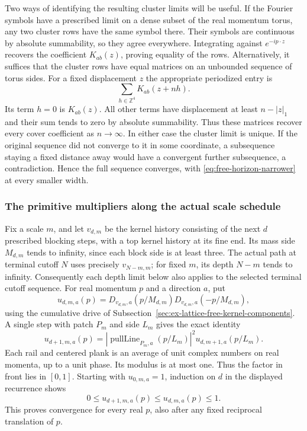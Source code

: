 Two ways of identifying the resulting cluster limits will be useful.
If the Fourier symbols have a prescribed limit on a dense subset of
the real momentum torus, any two cluster rows have the same symbol
there. Their symbols are continuous by absolute summability, so they
agree everywhere. Integrating against $e^{-ip\cdot z}$ recovers the
coefficient $K_{ab}(z)$, proving equality of the rows. Alternatively,
it suffices that the cluster rows have equal matrices on an unbounded
sequence of torus sides. For a fixed displacement $z$ the appropriate
periodized entry is
\[
                       \sum_{h\in\mathbb Z^4}K_{ab}(z+nh).
\]
Its term $h=0$ is $K_{ab}(z)$. All other terms have displacement
at least $n-|z|_1$ and their sum tends to zero by absolute summability.
Thus these matrices recover every cover coefficient as $n\to\infty$.
In either case the cluster limit is unique. If the original sequence
did not converge to it in some coordinate, a subsequence staying a
fixed distance away would have a convergent further subsequence,
a contradiction. Hence the full sequence converges, with
\eqref{eq:free-horizon-narrower} at every smaller width.

\subsubsection{The primitive multipliers along the actual scale schedule}
Fix a scale $m$, and let $v_{d,m}$ be the kernel history consisting of the next
$d$ prescribed blocking steps, with a top kernel history at its fine end. Its
mass side $M_{d,m}$ tends to infinity, since each block side is at least
three. The actual path at terminal cutoff $N$ uses precisely
$v_{N-m,m}$; for fixed $m$, its depth $N-m$ tends to infinity.
Consequently each depth limit below also applies to the selected terminal
cutoff sequence. For real momentum $p$ and a direction $a$, put
\[
 u_{d,m,a}(p)=D_{v_{d,m},a}(p/M_{d,m})
                         D_{v_{d,m},a}(-p/M_{d,m}),
\]
using the cumulative drive of
Subsection~\ref{sec:ex-lattice-free-kernel-components}.
A single step with patch $P_m$ and side $L_m$ gives the exact identity
\[
 u_{d+1,m,a}(p)=
  |\operatorname{pullLine}_{P_m,a}(p/L_m)|^2
                          u_{d,m+1,a}(p/L_m).
\]
Each rail and centered plank is an average of unit complex numbers on
real momenta, up to a unit phase. Its modulus is at most one. Thus the
factor in front lies in $[0,1]$. Starting with $u_{0,m,a}=1$, induction
on $d$ in the displayed recurrence shows
\[
                   0\le u_{d+1,m,a}(p)\le u_{d,m,a}(p)\le1.
\]
This proves convergence for every real $p$, also after any fixed
reciprocal translation of $p$.

